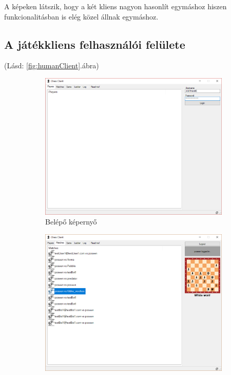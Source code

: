\documentclass[twoside, a4paper, 12pt]{book}
\begin{document}
A képeken látszik, hogy a két kliens nagyon hasonlít egymáshoz hiszen funkcionalitásban is elég közel állnak egymáshoz.

\subsection{A játékkliens felhasználói felülete}
(Lásd: \ref{fig:humanClient}.ábra)

\begin{figure}
	\centering
	\begin{subfigure}[b]{0.475\textwidth}
		\centering
		\includegraphics[width=\textwidth]{img/humanClientLogin.png}
		\caption{Belépő képernyő}
		\label{humanClientLogin}
	\end{subfigure}
	\hfill
	\begin{subfigure}[b]{0.475\textwidth}  
		\centering 
		\includegraphics[width=\textwidth]{img/humanClientMatches.png}

\end{subfigure}
\end{figure}
\end{document}

